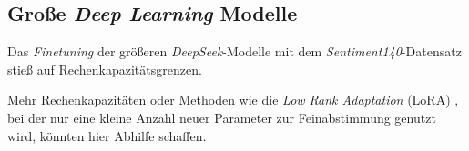 \subsection{Große \textit{Deep Learning} Modelle}

Das \textit{Finetuning} der größeren \textit{DeepSeek}-Modelle mit dem \textit{Sentiment140}-Datensatz stieß auf Rechenkapazitätsgrenzen.

Mehr Rechenkapazitäten oder Methoden wie die \textit{Low Rank Adaptation} (LoRA) \cite{lora2021}, bei der nur eine kleine Anzahl neuer Parameter zur Feinabstimmung genutzt wird, könnten hier Abhilfe schaffen.
